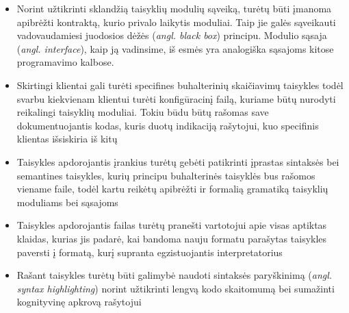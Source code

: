 \begin{activities}
{\begin{itemize}
            \item Norint užtikrinti sklandžią taisyklių modulių sąveiką, turėtų būti įmanoma apibrėžti kontraktą, kurio privalo laikytis moduliai. Taip jie galės sąveikauti vadovaudamiesi juodosios dėžės (\textit{angl. black box}) principu. Modulio sąsaja (\textit{angl. interface}), kaip ją vadinsime, iš esmės yra analogiška sąsajoms kitose programavimo kalbose.

            \item Skirtingi klientai gali turėti specifines buhalterinių skaičiavimų taisykles todėl svarbu kiekvienam klientui turėti konfigūracinį failą, kuriame būtų nurodyti reikalingi taisyklių moduliai. Tokiu būdu būtų rašomas save dokumentuojantis kodas, kuris duotų indikaciją rašytojui, kuo specifinis klientas išsiskiria iš kitų
            
            \item Taisykles apdorojantis įrankius turėtų gebėti patikrinti įprastas sintaksės bei semantines taisykles, kurių principu buhalterinės taisyklės bus rašomos viename faile, todėl kartu reikėtų apibrėžti ir formalią gramatiką taisyklių moduliams bei sąsajoms

            \item Taisykles apdorojantis failas turėtų pranešti vartotojui apie visas aptiktas klaidas, kurias jis padarė, kai bandoma nauju formatu parašytas taisykles paversti į formatą, kurį supranta egzistuojantis interpretatorius
            
            \item Rašant taisykles turėtų būti galimybė naudoti sintaksės paryškinimą (\textit{angl. syntax highlighting}) norint užtikrinti lengvą kodo skaitomumą bei sumažinti kognityvinę apkrovą rašytojui

        \end{itemize}
    }
     \row

\end{activities}
